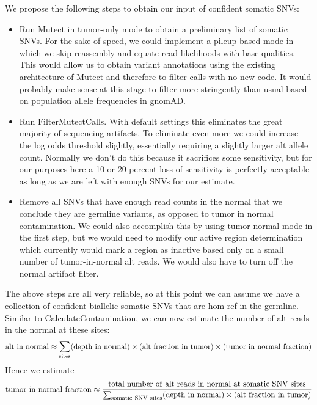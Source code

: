 \documentclass[nofootinbib,amssymb,amsmath]{revtex4}
\begin{document}
We propose the following steps to obtain our input of confident somatic SNVs:
\begin{itemize}
\item Run Mutect in tumor-only mode to obtain a preliminary list of somatic SNVs.  For the sake of speed, we could implement a pileup-based mode in which we skip reassembly and equate read likelihoods with base qualities.  This would allow us to obtain variant annotations using the existing architecture of Mutect and therefore to filter calls with no new code.  It would probably make sense at this stage to filter more stringently than usual based on population allele frequencies in gnomAD.
\item Run FilterMutectCalls.  With default settings this eliminates the great majority of sequencing artifacts.  To eliminate even more we could increase the log odds threshold slightly, essentially requiring a slightly larger alt allele count.  Normally we don't do this because it sacrifices some sensitivity, but for our purposes here a 10 or 20 percent loss of sensitivity is perfectly acceptable as long as we are left with enough SNVs for our estimate.
\item Remove all SNVs that have enough read counts in the normal that we conclude they are germline variants, as opposed to tumor in normal contamination.  We could also accomplish this by using tumor-normal mode in the first step, but we would need to modify our active region determination which currently would mark a region as inactive based only on a small number of tumor-in-normal alt reads.  We would also have to turn off the normal artifact filter.
\end{itemize}

The above steps are all very reliable, so at this point we can assume we have a collection of confident biallelic somatic SNVs that are hom ref in the germline.  Similar to CalculateContamination, we can now estimate the number of alt reads in the normal at these sites:
\begin{align}
{\rm alt~in~normal} \approx \sum_{\rm sites} ({\rm depth~in~normal}) \times ({\rm alt~fraction~in~tumor}) \times ({\rm tumor~in~normal~fraction})
\end{align}
Hence we estimate
\begin{align}
{\rm tumor~in~normal~fraction} \approx 
\frac{\rm total~number~of~alt~reads~in~normal~at~somatic~SNV~sites}
{\sum_{\rm somatic~SNV~sites} ({\rm depth~in~normal}) \times ({\rm alt~fraction~in~tumor})}
\end{align}
\end{document}
